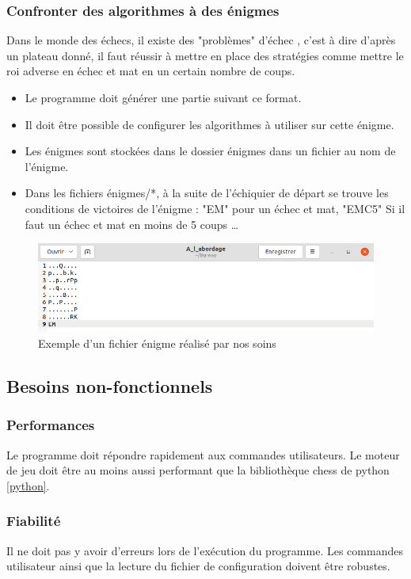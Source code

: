 \documentclass{article}
\begin{document}
\subsubsection{Confronter des algorithmes à des énigmes}
Dans le monde des échecs, il existe des "problèmes" d'échec \cite{Krt}, c'est à dire d'après un plateau donné, il faut réussir à mettre en place des stratégies comme mettre le roi adverse en échec et mat en un certain nombre de coups.
\begin{itemize}
    \item Le programme doit générer une partie suivant ce format.
    \item Il doit être possible de configurer les algorithmes à utiliser sur cette énigme.
    \item Les énigmes sont stockées dans le dossier énigmes dans un fichier au nom de l'énigme.
    \item Dans les fichiers énigmes/*, à la suite de l'échiquier de départ se trouve les conditions de victoires de l'énigme : "EM" pour un échec et mat, "EMC5" Si il faut un échec et mat en moins de 5 coups \dots
\end{itemize}
\begin{figure}[!h]
        \centering
        \includegraphics[scale = 0.3]{img/a_l_abordage.png}
        \caption{Exemple d'un fichier énigme réalisé par nos soins}
        \label{fig:enigm}
    \end{figure}
\medskip
\subsection{Besoins non-fonctionnels}
\medskip
\subsubsection{Performances}
Le programme doit répondre rapidement aux commandes utilisateurs.
Le moteur de jeu doit être au moins aussi performant que la bibliothèque chess de python \ref{python}.
\medskip
\subsubsection{Fiabilité}
Il ne doit pas y avoir d'erreurs lors de l'exécution du programme. 
Les commandes utilisateur ainsi que la lecture du fichier de configuration doivent être robustes.
\medskip
\end{document}

